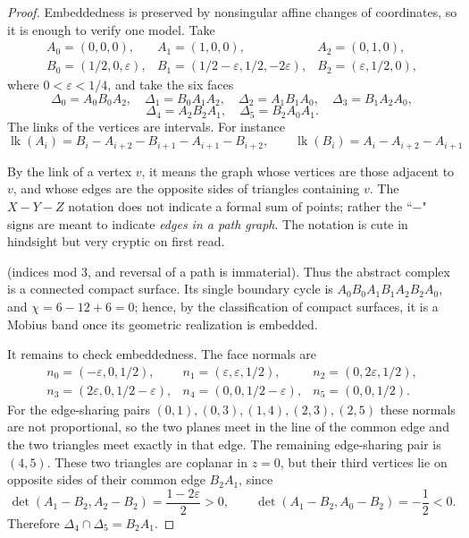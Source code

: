 \documentclass[12pt]{article}
\newcommand{\review}[1]{\begin{reviewbox}#1\end{reviewbox}}
\begin{document}
\begin{proof}
Embeddedness is preserved by nonsingular affine changes of coordinates,
so it is enough to verify one model.  Take
\[
\begin{array}{lll}
A_0=(0,0,0),& A_1=(1,0,0),& A_2=(0,1,0),\\
B_0=(1/2,0,\varepsilon),&
B_1=(1/2-\varepsilon,1/2,-2\varepsilon),&
B_2=(\varepsilon,1/2,0),
\end{array}
\]
where \(0<\varepsilon<1/4\), and take the six faces
\[
\Delta_0=A_0B_0A_2,\quad \Delta_1=B_0A_1A_2,\quad
\Delta_2=A_1B_1A_0,\quad \Delta_3=B_1A_2A_0,
\]
\[
\Delta_4=A_2B_2A_1,\quad \Delta_5=B_2A_0A_1 .
\]
The links of the vertices are intervals.  For instance
\[
 \operatorname{lk}(A_i)=
 B_i-A_{i+2}-B_{i+1}-A_{i+1}-B_{i+2},\qquad
 \operatorname{lk}(B_i)=A_i-A_{i+2}-A_{i+1}
\]

\review{By the link of a vertex $v$, it means the graph whose vertices are those adjacent to $v$, and whose edges are the opposite sides of triangles containing $v$. The $X - Y - Z$ notation does not indicate a formal sum of points; rather the ``$-$" signs are meant to indicate \emph{edges in a path graph}. The notation is cute in hindsight but very cryptic on first read.}

(indices mod \(3\), and reversal of a path is immaterial).  Thus the
abstract complex is a connected compact surface.  Its single boundary
cycle is \(A_0B_0A_1B_1A_2B_2A_0\), and
\(\chi=6-12+6=0\); hence, by the classification of compact surfaces, it
is a Mobius band once its geometric realization is embedded.

It remains to check embeddedness.  The face normals are
\[
\begin{array}{lll}
n_0=(-\varepsilon,0,1/2),&
n_1=(\varepsilon,\varepsilon,1/2),&
n_2=(0,2\varepsilon,1/2),\\
n_3=(2\varepsilon,0,1/2-\varepsilon),&
n_4=(0,0,1/2-\varepsilon),&
n_5=(0,0,1/2).
\end{array}
\]
For the edge-sharing pairs
\((0,1),(0,3),(1,4),(2,3),(2,5)\) these normals are not proportional, so
the two planes meet in the line of the common edge and the two triangles
meet exactly in that edge.  The remaining edge-sharing pair is
\((4,5)\).  These two triangles are coplanar in \(z=0\), but their third
vertices lie on opposite sides of their common edge \(B_2A_1\), since
\[
 \det(A_1-B_2,A_2-B_2)=\frac{1-2\varepsilon}{2}>0,\qquad
 \det(A_1-B_2,A_0-B_2)=-\frac{1}{2}<0 .
\]
Therefore \(\Delta_4\cap\Delta_5=B_2A_1\).


\end{proof}
\end{document}
